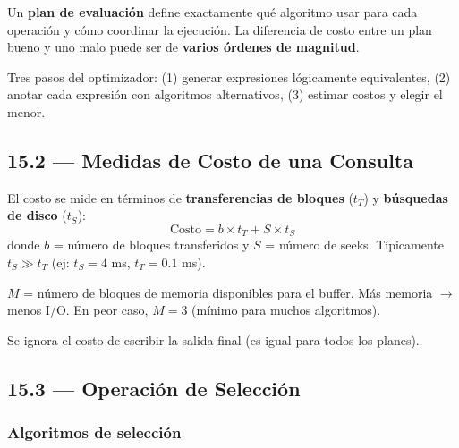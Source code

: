 \documentclass[11pt, a4paper]{article}
\begin{document}
Un \textbf{plan de evaluación} define exactamente qué algoritmo usar para cada operación y cómo coordinar la ejecución. La diferencia de costo entre un plan bueno y uno malo puede ser de \textbf{varios órdenes de magnitud}.

Tres pasos del optimizador: (1) generar expresiones lógicamente equivalentes, (2) anotar cada expresión con algoritmos alternativos, (3) estimar costos y elegir el menor.

\subsection{15.2 --- Medidas de Costo de una Consulta}

El costo se mide en términos de \textbf{transferencias de bloques} ($t_T$) y \textbf{búsquedas de disco} ($t_S$):
\[
	\text{Costo} = b \times t_T + S \times t_S
\]
donde $b$ = número de bloques transferidos y $S$ = número de seeks. Típicamente $t_S \gg t_T$ (ej: $t_S = 4$ ms, $t_T = 0.1$ ms).

$M$ = número de bloques de memoria disponibles para el buffer. Más memoria $\rightarrow$ menos I/O. En peor caso, $M = 3$ (mínimo para muchos algoritmos).

Se ignora el costo de escribir la salida final (es igual para todos los planes).

\subsection{15.3 --- Operación de Selección}

\subsubsection{Algoritmos de selección}
\end{document}
